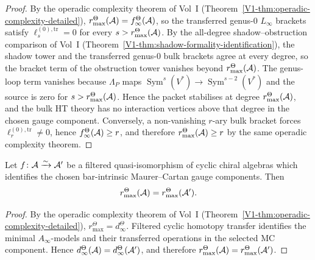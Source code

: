 \begin{proof}
By the operadic complexity theorem of Vol~I
\textup{(}Theorem~\textup{\ref*{V1-thm:operadic-complexity-detailed}}\textup{)},
\(r^\Theta_{\max}(\mathcal{A}) = f^\Theta_\infty(\mathcal{A})\), so the transferred genus-$0$
$L_\infty$ brackets satisfy
\(\ell_s^{(0),\mathrm{tr}} = 0\) for every
\(s > r^\Theta_{\max}(\mathcal{A})\).
By the all-degree shadow--obstruction comparison of Vol~I
\textup{(}Theorem~\textup{\ref*{V1-thm:shadow-formality-identification}}\textup{)},
the shadow tower and the transferred genus-$0$ bulk brackets agree at
every degree, so the bracket term of the obstruction tower vanishes
beyond \(r^\Theta_{\max}(\mathcal{A})\). The genus-loop term vanishes because
$\Lambda_P$ maps $\operatorname{Sym}^s(V^*) \to
\operatorname{Sym}^{s-2}(V^*)$ and the source is zero for
\(s > r^\Theta_{\max}(\mathcal{A})\). Hence the packet stabilises at degree
\(r^\Theta_{\max}(\mathcal{A})\), and the bulk HT theory has no interaction
vertices above that degree in the chosen gauge component. Conversely,
a non-vanishing $r$-ary bulk bracket
forces $\ell_r^{(0),\mathrm{tr}} \neq 0$, hence
\(f^\Theta_\infty(\mathcal{A}) \ge r\), and therefore
\(r^\Theta_{\max}(\mathcal{A}) \ge r\) by the same operadic complexity theorem.
\end{proof}

\begin{proposition}
\ClaimStatusProvedHere
{}
Let \(f\colon \mathcal{A} \xrightarrow{\sim} \mathcal{A}'\) be a filtered
quasi-isomorphism of cyclic chiral algebras which identifies the
chosen bar-intrinsic Maurer--Cartan gauge components. Then
\[
r^\Theta_{\max}(\mathcal{A})=r^\Theta_{\max}(\mathcal{A}').
\]
\end{proposition}

\begin{proof}
By the operadic complexity theorem of Vol~I
\textup{(}Theorem~\textup{\ref*{V1-thm:operadic-complexity-detailed}}\textup{)},
\(r^\Theta_{\max}=d^\Theta_\infty\). Filtered cyclic homotopy
transfer identifies the minimal \(A_\infty\)-models and their
transferred operations in the selected MC component. Hence
\(d^\Theta_\infty(\mathcal{A})=d^\Theta_\infty(\mathcal{A}')\), and therefore
\(r^\Theta_{\max}(\mathcal{A})=r^\Theta_{\max}(\mathcal{A}')\).
\end{proof}



